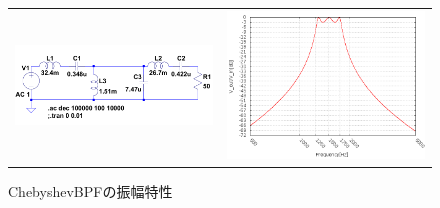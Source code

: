 \documentclass[10pt,a4j,dvipdfmx]{jsarticle}
\begin{document}
 \begin{figure}[H]
     \begin{tabular}{cc}
       \begin{minipage}[t]{0.45\hsize}
         \centering
         \includegraphics[width=8cm]{CheBPF.png}
         \caption{ChebyshevBPF($f_0 = 1500$)}
       \end{minipage} &
       \begin{minipage}[t]{0.45\hsize}
         \centering
         \includegraphics[width = 8cm]{CBPF_Vgraf.png}
         \caption{ChebyshevBPFの振幅特性}
       \end{minipage}
     \end{tabular}
   \end{figure}
\end{document}
